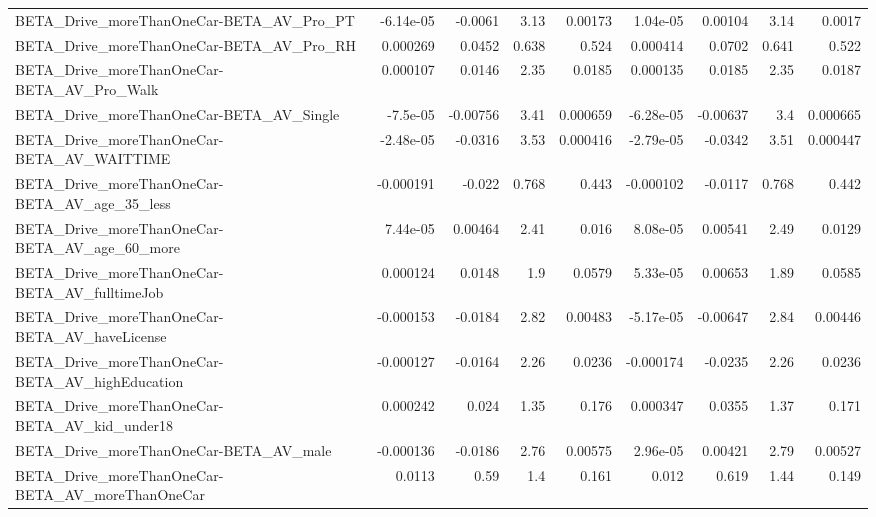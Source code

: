 \begin{tabular}{lrrrrrrrr}
BETA\_Drive\_moreThanOneCar-BETA\_AV\_Pro\_PT           &   -6.14e-05 &      -0.0061 &     3.13 &  0.00173 &   1.04e-05 &     0.00104 &         3.14 &        0.0017 \\
BETA\_Drive\_moreThanOneCar-BETA\_AV\_Pro\_RH           &    0.000269 &       0.0452 &    0.638 &    0.524 &   0.000414 &      0.0702 &        0.641 &         0.522 \\
BETA\_Drive\_moreThanOneCar-BETA\_AV\_Pro\_Walk         &    0.000107 &       0.0146 &     2.35 &   0.0185 &   0.000135 &      0.0185 &         2.35 &        0.0187 \\
BETA\_Drive\_moreThanOneCar-BETA\_AV\_Single           &    -7.5e-05 &     -0.00756 &     3.41 & 0.000659 &  -6.28e-05 &    -0.00637 &          3.4 &      0.000665 \\
BETA\_Drive\_moreThanOneCar-BETA\_AV\_WAITTIME         &   -2.48e-05 &      -0.0316 &     3.53 & 0.000416 &  -2.79e-05 &     -0.0342 &         3.51 &      0.000447 \\
BETA\_Drive\_moreThanOneCar-BETA\_AV\_age\_35\_less      &   -0.000191 &       -0.022 &    0.768 &    0.443 &  -0.000102 &     -0.0117 &        0.768 &         0.442 \\
BETA\_Drive\_moreThanOneCar-BETA\_AV\_age\_60\_more      &    7.44e-05 &      0.00464 &     2.41 &    0.016 &   8.08e-05 &     0.00541 &         2.49 &        0.0129 \\
BETA\_Drive\_moreThanOneCar-BETA\_AV\_fulltimeJob      &    0.000124 &       0.0148 &      1.9 &   0.0579 &   5.33e-05 &     0.00653 &         1.89 &        0.0585 \\
BETA\_Drive\_moreThanOneCar-BETA\_AV\_haveLicense      &   -0.000153 &      -0.0184 &     2.82 &  0.00483 &  -5.17e-05 &    -0.00647 &         2.84 &       0.00446 \\
BETA\_Drive\_moreThanOneCar-BETA\_AV\_highEducation    &   -0.000127 &      -0.0164 &     2.26 &   0.0236 &  -0.000174 &     -0.0235 &         2.26 &        0.0236 \\
BETA\_Drive\_moreThanOneCar-BETA\_AV\_kid\_under18      &    0.000242 &        0.024 &     1.35 &    0.176 &   0.000347 &      0.0355 &         1.37 &         0.171 \\
BETA\_Drive\_moreThanOneCar-BETA\_AV\_male             &   -0.000136 &      -0.0186 &     2.76 &  0.00575 &   2.96e-05 &     0.00421 &         2.79 &       0.00527 \\
BETA\_Drive\_moreThanOneCar-BETA\_AV\_moreThanOneCar   &      0.0113 &         0.59 &      1.4 &    0.161 &      0.012 &       0.619 &         1.44 &         0.149 \\

\end{tabular}
